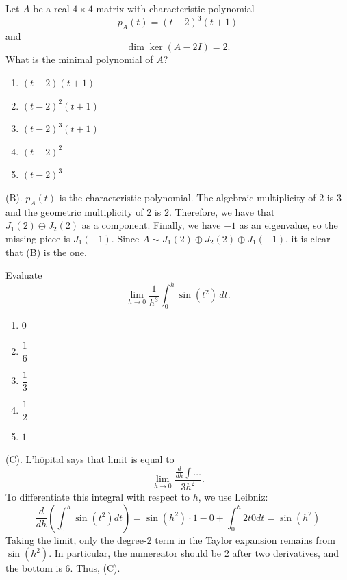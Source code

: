 \begin{exercise}
Let $A$ be a real $4\times4$ matrix with characteristic polynomial
\[
p_A(t)=(t-2)^3(t+1)
\]
and
\[
\dim\ker(A-2I)=2.
\]
What is the minimal polynomial of $A$?
\begin{enumerate}[label=(\Alph*)]
    \item $(t-2)(t+1)$
    \item $(t-2)^2(t+1)$
    \item $(t-2)^3(t+1)$
    \item $(t-2)^2$
    \item $(t-2)^3$
\end{enumerate}
\end{exercise}
\begin{solution}
(B). $p_A(t)$ is the characteristic polynomial. The algebraic multiplicity of $2$ is $3$
and the geometric multiplicity of $2$ is $2$. 
Therefore, we have that $J_1(2) \oplus J_2(2)$ as a component. Finally, we have $-1$ 
as an eigenvalue, so the missing piece is $J_1(-1)$. 
Since $A \sim J_1(2) \oplus J_2(2) \oplus J_1(-1)$, it is clear that (B) is the one.
\end{solution}

\begin{exercise}
Evaluate
\[
\lim_{h\to0}
\frac1{h^3}
\int_0^h\sin(t^2)\,dt.
\]
\begin{enumerate}[label=(\Alph*)]
    \item $0$
    \item $\dfrac16$
    \item $\dfrac13$
    \item $\dfrac12$
    \item $1$
\end{enumerate}
\end{exercise}
\begin{solution}
(C). L'h\"{o}pital says that limit is equal to 
\[
\lim_{h \rightarrow 0} \frac{\frac{d}{dh} \int \dots}{3h^2}.
\]
To differentiate this integral with respect to $h$, we use Leibniz:
\[
\frac{d}{dh} \left(\int_0^h\sin(t^2) dt\right)
= \sin(h^2) \cdot 1 - 0 + \int_0^h 2t 0 dt
= \sin(h^2)
\]
Taking the limit, only the degree-$2$ term in the Taylor expansion remains from
 $\sin(h^2)$. In particular, the numereator should be $2$ after 
two derivatives, and the bottom is $6$. Thus, (C).
\end{solution}



